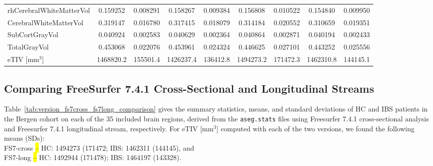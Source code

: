 \documentclass[diagnostics,article,accept,pdftex,moreauthors]{Definitions/mdpi}
\begin{document}
\begin{table}[H]
\begin{tabular}{lcccccccc}
rhCerebralWhiteMatterVol & 0.159252 & 0.008291 & 0.158267 & 0.009384 & 0.156808 & 0.010522 & 0.154840 & 0.009950 \\
CerebralWhiteMatterVol & 0.319147 & 0.016780 & 0.317415 & 0.018079 & 0.314184 & 0.020552 & 0.310659 & 0.019351 \\
SubCortGrayVol & 0.040924 & 0.002583 & 0.040629 & 0.002364 & 0.040864 & 0.002871 & 0.040194 & 0.002433 \\
TotalGrayVol & 0.453068 & 0.022076 & 0.453961 & 0.024324 & 0.446625 & 0.027101 & 0.443252 & 0.025556 \\
eTIV [mm$^3$] & 1468820.2 & 155501.4 &  1426237.4 & 136412.8 & 1494273.2 & 171472.3 & 1462310.8 & 144145.1 \\
\toprule
\end{tabular}
\label{tab:version_fs6_fs7_comparison}
\end{table}


\subsection{Comparing FreeSurfer 7.4.1 Cross-Sectional and Longitudinal Streams}



 Table~\ref{tab:version_fs7cross_fs7long_comparison} gives the summary statistics, means, and standard deviations of HC and IBS patients in the Bergen cohort on each of the 35 included brain regions, derived from the \texttt{aseg.stats} files using Freesurfer 7.4.1 cross-sectional analysis and Freesurfer 7.4.1 longitudinal stream, respectively. For eTIV [mm$^3$] computed with each of the two versions, we found the following means (SDs):\\
\indent FS7-cross \hl{--} HC: 1494273 (171472; IBS: 1462311 (144145), and\\
\indent FS7-long \hl{--} HC: 1492944 (171478); IBS: 1464197 (143328).
\end{document}
